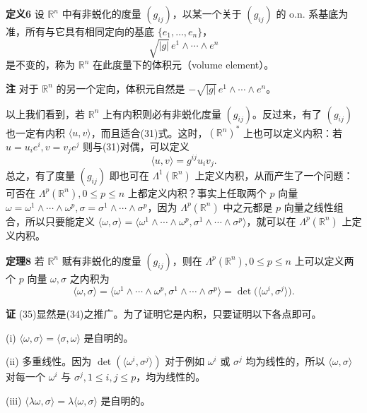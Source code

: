 \noindent\textbf{定义6}
设 $\mathbb R^n$ 中有非蜕化的度量 $(g_{ij})$，以某一个关于 $(g_{ij})$ 的 o.n. 系基底为准，所有与它具有相同定向的基底 $\{e_1,\ldots,e_n\}$，
\[
 \sqrt{|g|}\,e^1\wedge\cdots\wedge e^n
\]
是不变的，称为 $\mathbb R^n$ 在此度量下的体积元（volume element）。

\noindent\textbf{注}
对于 $\mathbb R^n$ 的另一个定向，体积元自然是 $-\sqrt{|g|}\,e^1\wedge\cdots\wedge e^n$。

以上我们看到，若 $\mathbb R^n$ 上有内积则必有非蜕化度量 $(g_{ij})$。反过来，有了 $(g_{ij})$ 也一定有内积 $\langle u,v\rangle$，而且适合(31)式。这时，$(\mathbb R^n)^*$ 上也可以定义内积：若 $u=u_i e^i,v=v_j e^j$ 则与(31)对偶，可以定义
\begin{equation}
 \langle u,v\rangle=g^{ij}u_iv_j.
 \tag{34}
\end{equation}
总之，有了度量 $(g_{ij})$ 即也可在 $\Lambda^1(\mathbb R^n)$ 上定义内积，从而产生了一个问题：可否在 $\Lambda^p(\mathbb R^n),0\le p\le n$ 上都定义内积？事实上任取两个 $p$ 向量 $\omega=\omega^1\wedge\cdots\wedge\omega^p,\sigma=\sigma^1\wedge\cdots\wedge\sigma^p$，因为 $\Lambda^p(\mathbb R^n)$ 中之元都是 $p$ 向量之线性组合，所以只要能定义 $\langle\omega,\sigma\rangle=\langle\omega^1\wedge\cdots\wedge\omega^p,\sigma^1\wedge\cdots\wedge\sigma^p\rangle$，就可以在 $\Lambda^p(\mathbb R^n)$ 上定义内积。

\noindent\textbf{定理8}
若 $\mathbb R^n$ 赋有非蜕化的度量 $(g_{ij})$，则在 $\Lambda^p(\mathbb R^n),0\le p\le n$ 上可以定义两个 $p$ 向量 $\omega,\sigma$ 之内积为
\begin{equation}
 \langle\omega,\sigma\rangle
 =\langle\omega^1\wedge\cdots\wedge\omega^p,
 \sigma^1\wedge\cdots\wedge\sigma^p\rangle
 =\det\bigl(\langle\omega^i,\sigma^j\rangle\bigr).
 \tag{35}
\end{equation}

\noindent\textbf{证}
(35)显然是(34)之推广。为了证明它是内积，只要证明以下各点即可。

(i) $\langle\omega,\sigma\rangle=\langle\sigma,\omega\rangle$ 是自明的。

(ii) 多重线性。因为 $\det(\langle\omega^i,\sigma^j\rangle)$ 对于例如 $\omega^i$ 或 $\sigma^j$ 均为线性的，所以 $\langle\omega,\sigma\rangle$ 对每一个 $\omega^i$ 与 $\sigma^j,1\le i,j\le p$，均为线性的。

(iii) $\langle\lambda\omega,\sigma\rangle=\lambda\langle\omega,\sigma\rangle$ 是自明的。

